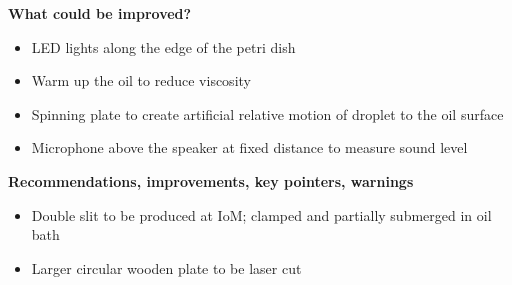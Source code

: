 \textbf{What could be improved?}

\begin{itemize}
\item LED lights along the edge of the petri dish
\item Warm up the oil to reduce viscosity
\item Spinning plate to create artificial relative motion of droplet to the oil surface
\item Microphone above the speaker at fixed distance to measure sound level
\end{itemize}

\bigskip


\textbf{Recommendations, improvements, key pointers, warnings}

\begin{itemize}
\item Double slit to be produced at IoM; clamped and partially submerged in oil bath
\item Larger circular wooden plate to be laser cut
\end{itemize}
